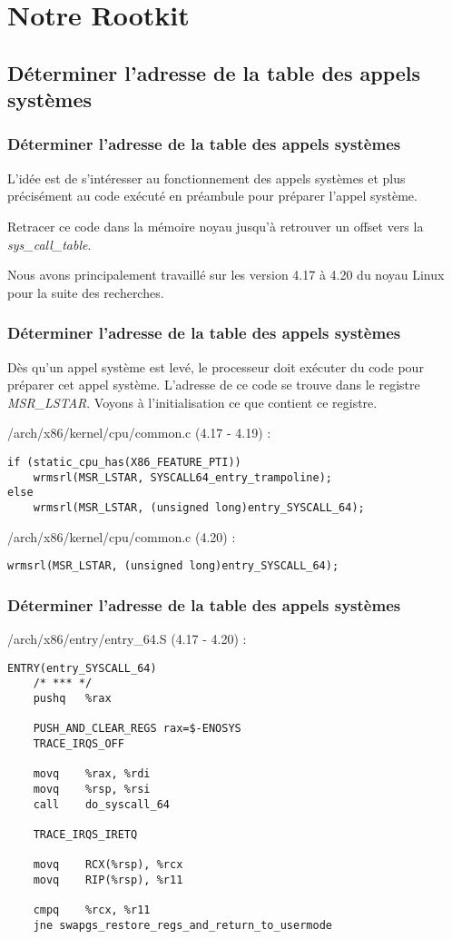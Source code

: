 \documentclass{beamer}
\begin{document}
\section{Notre Rootkit}
\subsection{Déterminer l'adresse de la table des appels systèmes}

\begin{frame}
\frametitle{Déterminer l'adresse de la table des appels systèmes}
L'idée est de s'intéresser au fonctionnement des appels systèmes et plus précisément au code exécuté en préambule pour préparer l'appel système.

\medskip
Retracer ce code dans la mémoire noyau jusqu'à retrouver un offset vers la \textit{sys\_call\_table}.

\medskip
Nous avons principalement travaillé sur les version 4.17 à 4.20 du noyau Linux pour la suite des recherches.
\end{frame}

\begin{frame}[fragile]
\frametitle{Déterminer l'adresse de la table des appels systèmes}
Dès qu'un appel système est levé, le processeur doit exécuter du code pour préparer cet appel système. L'adresse de ce code se trouve dans le registre \textit{MSR\_LSTAR}. Voyons à l'initialisation ce que contient ce registre.

\medskip
/arch/x86/kernel/cpu/common.c (4.17 - 4.19) :
\begin{lstlisting}[style=CStyle]
if (static_cpu_has(X86_FEATURE_PTI))
	wrmsrl(MSR_LSTAR, SYSCALL64_entry_trampoline);
else
	wrmsrl(MSR_LSTAR, (unsigned long)entry_SYSCALL_64);
\end{lstlisting}

\medskip
/arch/x86/kernel/cpu/common.c (4.20) :
\begin{lstlisting}[style=CStyle]
wrmsrl(MSR_LSTAR, (unsigned long)entry_SYSCALL_64);
\end{lstlisting}
\end{frame}

\begin{frame}[fragile]
\frametitle{Déterminer l'adresse de la table des appels systèmes}
/arch/x86/entry/entry\_64.S (4.17 - 4.20) :
\begin{lstlisting}[style=CStyle]
ENTRY(entry_SYSCALL_64)
	/* *** */
	pushq	%rax

	PUSH_AND_CLEAR_REGS rax=$-ENOSYS
	TRACE_IRQS_OFF

	movq	%rax, %rdi
	movq	%rsp, %rsi
	call	do_syscall_64

	TRACE_IRQS_IRETQ

	movq	RCX(%rsp), %rcx
	movq	RIP(%rsp), %r11

	cmpq	%rcx, %r11
	jne	swapgs_restore_regs_and_return_to_usermode
\end{lstlisting}
\end{frame}
\end{document}
